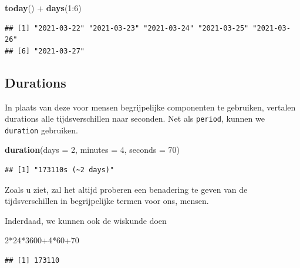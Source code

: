 \documentclass[]{tufte-book}
\newenvironment{Shaded}{}{}
\newcommand{\DataTypeTok}[1]{\textcolor[rgb]{0.56,0.13,0.00}{#1}}
\newcommand{\DecValTok}[1]{\textcolor[rgb]{0.25,0.63,0.44}{#1}}
\newcommand{\KeywordTok}[1]{\textcolor[rgb]{0.00,0.44,0.13}{\textbf{#1}}}
\newcommand{\NormalTok}[1]{#1}
\newcommand{\OperatorTok}[1]{\textcolor[rgb]{0.40,0.40,0.40}{#1}}
\newcommand{\StringTok}[1]{\textcolor[rgb]{0.25,0.44,0.63}{#1}}
\begin{document}
\begin{Shaded}
\begin{Highlighting}[]
\KeywordTok{today}\NormalTok{() }\OperatorTok{+}\StringTok{ }\KeywordTok{days}\NormalTok{(}\DecValTok{1}\OperatorTok{:}\DecValTok{6}\NormalTok{)}
\end{Highlighting}
\end{Shaded}

\begin{verbatim}
## [1] "2021-03-22" "2021-03-23" "2021-03-24" "2021-03-25" "2021-03-26"
## [6] "2021-03-27"
\end{verbatim}

\hypertarget{durations}{%
\subsection{Durations}\label{durations}}

In plaats van deze voor mensen begrijpelijke componenten te gebruiken, vertalen durations alle tijdsverschillen naar seconden. Net als \texttt{period}, kunnen we \texttt{duration} gebruiken.

\begin{Shaded}
\begin{Highlighting}[]
\KeywordTok{duration}\NormalTok{(}\DataTypeTok{days =} \DecValTok{2}\NormalTok{, }\DataTypeTok{minutes =} \DecValTok{4}\NormalTok{, }\DataTypeTok{seconds =} \DecValTok{70}\NormalTok{)}
\end{Highlighting}
\end{Shaded}

\begin{verbatim}
## [1] "173110s (~2 days)"
\end{verbatim}

Zoals u ziet, zal het altijd proberen een benadering te geven van de tijdsverschillen in begrijpelijke termen voor ons, mensen.

Inderdaad, we kunnen ook de wiskunde doen

\begin{Shaded}
\begin{Highlighting}[]
\DecValTok{2}\OperatorTok{*}\DecValTok{24}\OperatorTok{*}\DecValTok{3600}\OperatorTok{+}\DecValTok{4}\OperatorTok{*}\DecValTok{60}\OperatorTok{+}\DecValTok{70}
\end{Highlighting}
\end{Shaded}

\begin{verbatim}
## [1] 173110
\end{verbatim}
\end{document}

